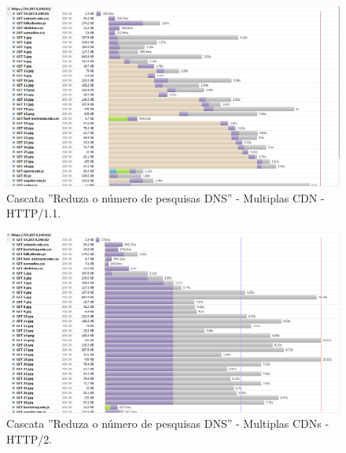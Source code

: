 \begin{apendicesenv}
\begin{landscape}
	\begin{figure}[!htb]
    	\centering
	    \caption{Cascata ''Reduza o número de pesquisas DNS'' - Multiplas CDN - HTTP/1.1.}
    	\includegraphics[width=1.5\textwidth]{./04-figuras/cascatas/multiple_http11}
	\end{figure}
\end{landscape}

\begin{landscape}
	\begin{figure}[!htb]
    	\centering
	    \caption{Cascata ''Reduza o número de pesquisas DNS'' - Multiplas CDNs - HTTP/2.}
	    \includegraphics[width=1.5\textwidth]{./04-figuras/cascatas/multiple_http2}
	\end{figure}
\end{landscape}


\end{apendicesenv}
